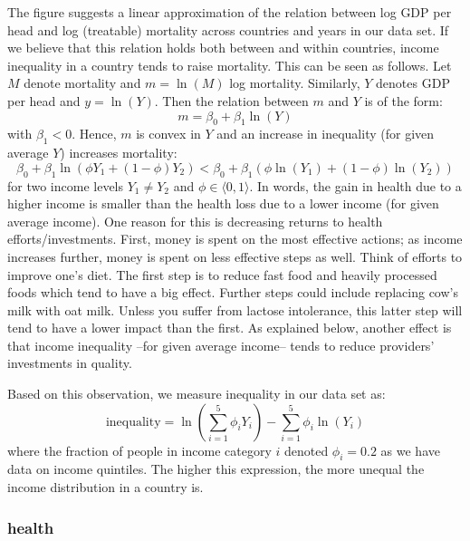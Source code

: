 \documentclass[12pt,english,a4paper]{article}
\begin{document}
The figure suggests a linear approximation of the relation between log GDP per head and log (treatable) mortality across countries and years in our data set. If we believe that this relation holds both between and within countries, income inequality in a country tends to raise mortality. This can be seen as follows. Let \(M\) denote mortality and \(m=\ln(M)\) log mortality. Similarly, \(Y\) denotes GDP per head and \(y=\ln(Y)\). Then the relation between \(m\) and \(Y\) is of the form:
\begin{equation}
\label{eq:2}
m = \beta_0 + \beta_1 \ln(Y)
\end{equation}
with \(\beta_1 <0\). Hence, \(m\) is convex in \(Y\) and an increase in inequality (for given average \(Y\)) increases mortality:
\begin{equation}
\label{eq:3}
\beta_0 + \beta_1 \ln(\phi Y_1 + (1-\phi) Y_2) < \beta_0 + \beta_1 (\phi \ln(Y_1) + (1-\phi) \ln(Y_2))
\end{equation}
for two income levels \(Y_1 \neq Y_2\) and \(\phi \in \langle 0,1 \rangle\). In words, the gain in health due to a higher income is smaller than the health loss due to a lower income (for given average income). One reason for this is decreasing returns to health efforts/investments. First, money is spent on the most effective actions; as income increases further, money is spent on less effective steps as well. Think of efforts to improve one's diet. The first step is to reduce fast food and heavily processed foods which tend to have a big effect. Further steps could include replacing cow's milk with oat milk. Unless you suffer from lactose intolerance, this latter step will tend to have a lower impact than the first. As explained below, another effect is that income inequality --for given average income-- tends to reduce providers' investments in quality.

Based on this observation, we measure inequality in our data set as:
\begin{equation}
\label{eq:19}
\text{inequality} = \ln\left(\sum_{i=1}^5 \phi_i Y_i \right) - \sum_{i=1}^5 \phi_i \ln(Y_i)
\end{equation}
where the fraction of people in income category \(i\) denoted \(\phi_i = 0.2\) as we have data on income quintiles. The higher this expression, the more unequal the income distribution in a country is.

\subsubsection{health}
\label{sec:orgc81c8d6}
\end{document}
